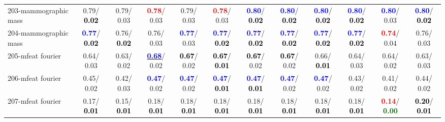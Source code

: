 \begin{table}[h]
\begin{center}
{\begin{tabular}{lc|c|c|c|c|c|c|c|c|c|c}
203-mammographic mass &   0.79/\textcolor{black}{\textbf{  0.02}} &   0.79/  0.03 & \textcolor{red}{\textbf{  0.78}}/  0.03 &   0.79/  0.03 & \textcolor{red}{\textbf{  0.78}}/  0.03 & \textcolor{blue}{\textbf{  0.80}}/\textcolor{black}{\textbf{  0.02}} & \textcolor{blue}{\textbf{  0.80}}/\textcolor{black}{\textbf{  0.02}} & \textcolor{blue}{\textbf{  0.80}}/\textcolor{black}{\textbf{  0.02}} & \textcolor{blue}{\textbf{  0.80}}/\textcolor{black}{\textbf{  0.02}} & \textcolor{blue}{\textbf{  0.80}}/  0.03 & \textcolor{blue}{\textbf{  0.80}}/\textcolor{black}{\textbf{  0.02}} \\
204-mammographic mass & \textcolor{blue}{\textbf{  0.77}}/\textcolor{black}{\textbf{  0.02}} &   0.76/\textcolor{black}{\textbf{  0.02}} &   0.76/  0.03 & \textcolor{blue}{\textbf{  0.77}}/  0.03 & \textcolor{blue}{\textbf{  0.77}}/\textcolor{black}{\textbf{  0.02}} & \textcolor{blue}{\textbf{  0.77}}/\textcolor{black}{\textbf{  0.02}} & \textcolor{blue}{\textbf{  0.77}}/\textcolor{black}{\textbf{  0.02}} & \textcolor{blue}{\textbf{  0.77}}/\textcolor{black}{\textbf{  0.02}} & \textcolor{blue}{\textbf{  0.77}}/\textcolor{black}{\textbf{  0.02}} & \textcolor{red}{\textbf{  0.74}}/  0.04 &   0.76/  0.03 \\
205-mfeat fourier &   0.64/  0.03 &   0.63/  0.02 & \underline{\textcolor{blue}{\textbf{  0.68}}}/  0.02 & \textcolor{black}{\textbf{  0.67}}/  0.02 & \textcolor{black}{\textbf{  0.67}}/\textcolor{black}{\textbf{  0.01}} & \textcolor{black}{\textbf{  0.67}}/  0.02 & \textcolor{black}{\textbf{  0.67}}/  0.02 &   0.66/\textcolor{black}{\textbf{  0.01}} &   0.64/  0.03 &   0.64/  0.02 &   0.63/  0.03 \\
206-mfeat fourier &   0.45/  0.02 &   0.42/  0.03 & \textcolor{blue}{\textbf{  0.47}}/  0.02 & \textcolor{blue}{\textbf{  0.47}}/  0.02 & \textcolor{blue}{\textbf{  0.47}}/\textcolor{black}{\textbf{  0.01}} & \textcolor{blue}{\textbf{  0.47}}/\textcolor{black}{\textbf{  0.01}} & \textcolor{blue}{\textbf{  0.47}}/  0.02 & \textcolor{blue}{\textbf{  0.47}}/  0.02 &   0.43/  0.02 &   0.41/  0.02 &   0.44/  0.02 \\ \hline
207-mfeat fourier &   0.17/\textcolor{black}{\textbf{  0.01}} &   0.15/\textcolor{black}{\textbf{  0.01}} &   0.18/\textcolor{black}{\textbf{  0.01}} &   0.18/\textcolor{black}{\textbf{  0.01}} &   0.18/\textcolor{black}{\textbf{  0.01}} &   0.18/\textcolor{black}{\textbf{  0.01}} &   0.18/\textcolor{black}{\textbf{  0.01}} &   0.18/\textcolor{black}{\textbf{  0.01}} &   0.18/\textcolor{black}{\textbf{  0.01}} & \textcolor{red}{\textbf{  0.14}}/\textcolor{darkgreen}{\textbf{  0.00}} & \textcolor{black}{\textbf{  0.20}}/\textcolor{black}{\textbf{  0.01}} \\

\end{tabular}}
\end{center}
\end{table}
